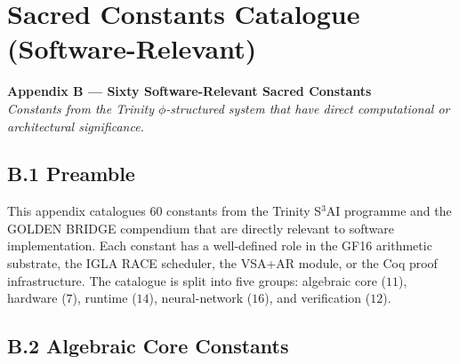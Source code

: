 \chapter{Sacred Constants Catalogue (Software-Relevant)}
\label{app:B-sacred-constants}

\begin{center}
\textbf{Appendix B --- Sixty Software-Relevant Sacred Constants} \\[1em]
\textit{Constants from the Trinity $\phi$-structured system that have
direct computational or architectural significance.}
\end{center}

\section*{B.1 Preamble}
\label{app:B-preamble}

This appendix catalogues $60$ constants from the Trinity
S$^{3}$AI programme and the GOLDEN BRIDGE compendium that are
directly relevant to software implementation. Each constant has a
well-defined role in the GF16 arithmetic substrate, the IGLA RACE
scheduler, the VSA+AR module, or the Coq proof infrastructure. The
catalogue is split into five groups: algebraic core ($11$), hardware
($7$), runtime ($14$), neural-network ($16$), and verification ($12$).

\section*{B.2 Algebraic Core Constants}
\label{app:B-algebraic}

